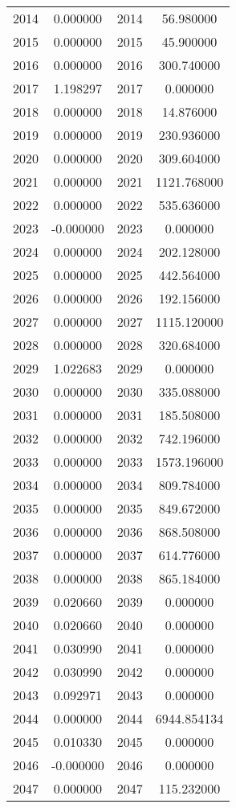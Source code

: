 \documentclass[12pt]{article}
\begin{document}
\begin{longtable}{@{}cccc@{}}
2014 & 0.000000 & 2014 & 56.980000 \\
2015 & 0.000000 & 2015 & 45.900000 \\
2016 & 0.000000 & 2016 & 300.740000 \\
2017 & 1.198297 & 2017 & 0.000000 \\
2018 & 0.000000 & 2018 & 14.876000 \\
2019 & 0.000000 & 2019 & 230.936000 \\
2020 & 0.000000 & 2020 & 309.604000 \\
2021 & 0.000000 & 2021 & 1121.768000 \\
2022 & 0.000000 & 2022 & 535.636000 \\
2023 & -0.000000 & 2023 & 0.000000 \\
2024 & 0.000000 & 2024 & 202.128000 \\
2025 & 0.000000 & 2025 & 442.564000 \\
2026 & 0.000000 & 2026 & 192.156000 \\
2027 & 0.000000 & 2027 & 1115.120000 \\
2028 & 0.000000 & 2028 & 320.684000 \\
2029 & 1.022683 & 2029 & 0.000000 \\
2030 & 0.000000 & 2030 & 335.088000 \\
2031 & 0.000000 & 2031 & 185.508000 \\
2032 & 0.000000 & 2032 & 742.196000 \\
2033 & 0.000000 & 2033 & 1573.196000 \\
2034 & 0.000000 & 2034 & 809.784000 \\
2035 & 0.000000 & 2035 & 849.672000 \\
2036 & 0.000000 & 2036 & 868.508000 \\
2037 & 0.000000 & 2037 & 614.776000 \\
2038 & 0.000000 & 2038 & 865.184000 \\
2039 & 0.020660 & 2039 & 0.000000 \\
2040 & 0.020660 & 2040 & 0.000000 \\
2041 & 0.030990 & 2041 & 0.000000 \\
2042 & 0.030990 & 2042 & 0.000000 \\
2043 & 0.092971 & 2043 & 0.000000 \\
2044 & 0.000000 & 2044 & 6944.854134 \\
2045 & 0.010330 & 2045 & 0.000000 \\
2046 & -0.000000 & 2046 & 0.000000 \\
2047 & 0.000000 & 2047 & 115.232000 \\

\end{longtable}
\end{document}

